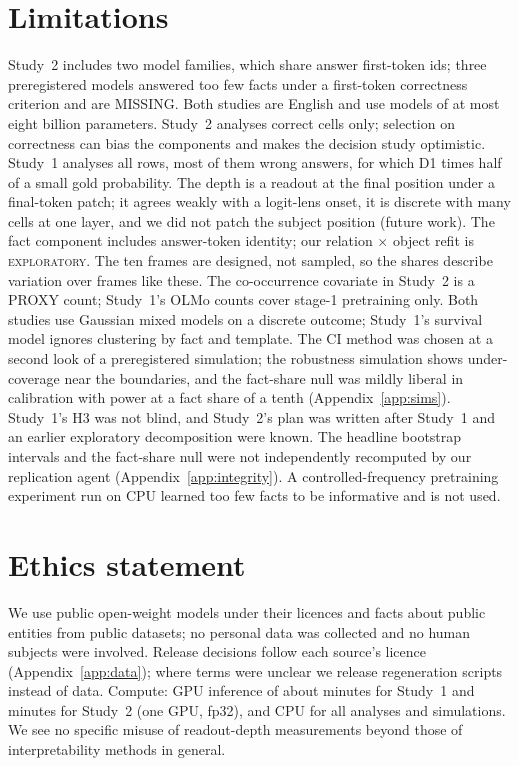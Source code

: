 \documentclass[11pt]{article}
\newcommand{\expl}{\textsc{exploratory}\xspace}
\newcommand{\SOne}{Study~1\xspace} %
\newcommand{\STwo}{Study~2\xspace} %
\begin{document}
\section*{Limitations}
\STwo includes two model families, which share answer first-token ids; three preregistered models answered too few facts under a first-token correctness criterion and are MISSING.
Both studies are English and use models of at most eight billion parameters.
\STwo analyses correct cells only; selection on correctness can bias the components and makes the decision study optimistic.
\SOne analyses all rows, most of them wrong answers, for which D1 times half of a small gold probability.
The depth is a readout at the final position under a final-token patch; it agrees weakly with a logit-lens onset, it is discrete with many cells at one layer, and we did not patch the subject position (future work).
The fact component includes answer-token identity; our relation $\times$ object refit is \expl.
The ten frames are designed, not sampled, so the shares describe variation over frames like these.
The co-occurrence covariate in \STwo is a PROXY count; \SOne's OLMo counts cover stage-1 pretraining only.
Both studies use Gaussian mixed models on a discrete outcome; \SOne's survival model ignores clustering by fact and template.
The CI method was chosen at a second look of a preregistered simulation; the robustness simulation shows under-coverage near the boundaries, and the fact-share null was mildly liberal in calibration with power \ptCalPowerRejOne{} at a fact share of a tenth (Appendix~\ref{app:sims}).
\SOne's H3 was not blind, and \STwo's plan was written after \SOne and an earlier exploratory decomposition were known.
The headline bootstrap intervals and the fact-share null were not independently recomputed by our replication agent (Appendix~\ref{app:integrity}).
A controlled-frequency pretraining experiment run on CPU learned too few facts to be informative and is not used.

\section*{Ethics statement}
We use public open-weight models under their licences and facts about public entities from public datasets; no personal data was collected and no human subjects were involved.
Release decisions follow each source's licence (Appendix~\ref{app:data}); where terms were unclear we release regeneration scripts instead of data.
Compute: GPU inference of about \cmpGpuMinHr{} minutes for \SOne{} and \cmpGpuMinPTwo{} minutes for \STwo{} (one GPU, fp32), and CPU for all analyses and simulations.
We see no specific misuse of readout-depth measurements beyond those of interpretability methods in general.
\end{document}
